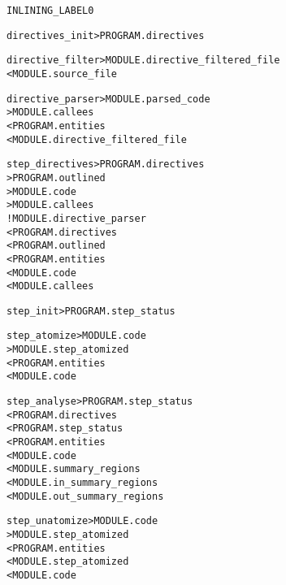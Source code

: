 \documentclass[a4paper]{report}
\newenvironment{PipsProp}{\begin{alltt}}{\end{alltt}}
\newenvironment{PipsMake}{\begin{alltt}}{\end{alltt}}
\begin{document}
\begin{PipsProp}
INLINING_LABEL 0
\end{PipsProp}


\begin{PipsMake}
directives_init             > PROGRAM.directives
\end{PipsMake}

\begin{PipsMake}
directive_filter            > MODULE.directive_filtered_file
   < MODULE.source_file
\end{PipsMake}

\begin{PipsMake}
directive_parser            > MODULE.parsed_code
                            > MODULE.callees
   < PROGRAM.entities
   < MODULE.directive_filtered_file
\end{PipsMake}

\begin{PipsMake}
step_directives             > PROGRAM.directives
                            > PROGRAM.outlined
                            > MODULE.code
                            > MODULE.callees
   ! MODULE.directive_parser
   < PROGRAM.directives
   < PROGRAM.outlined
   < PROGRAM.entities
   < MODULE.code
   < MODULE.callees
\end{PipsMake}


\begin{PipsMake}
step_init                   > PROGRAM.step_status
\end{PipsMake}

\begin{PipsMake}
step_atomize                > MODULE.code
                            > MODULE.step_atomized
   < PROGRAM.entities
   < MODULE.code
\end{PipsMake}

\begin{PipsMake}
step_analyse                > PROGRAM.step_status
   < PROGRAM.directives
   < PROGRAM.step_status
   < PROGRAM.entities
   < MODULE.code
   < MODULE.summary_regions
   < MODULE.in_summary_regions
   < MODULE.out_summary_regions
\end{PipsMake}

\begin{PipsMake}
step_unatomize              > MODULE.code
                            > MODULE.step_atomized
   < PROGRAM.entities
   < MODULE.step_atomized
   < MODULE.code
\end{PipsMake}
\end{document}
